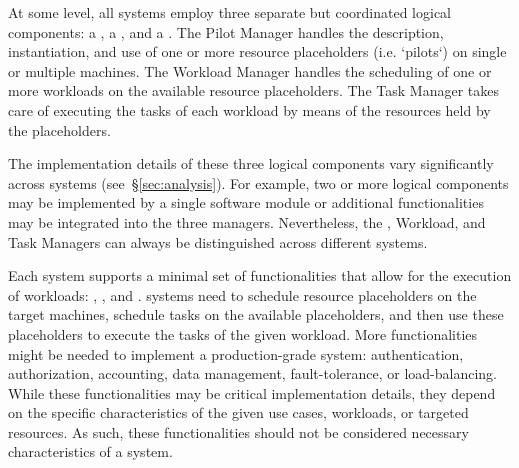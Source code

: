 \documentclass{sig-alternate}
\begin{document}
At some level, all \pilotjob systems employ three separate but coordinated
logical components: a , a , and a
. The Pilot Manager handles the description, instantiation,
and use of one or more resource placeholders (i.e. `pilots`) on single or
multiple machines. The Workload Manager handles the scheduling of one or more
workloads on the available resource placeholders. The Task Manager takes care of
executing the tasks of each workload by means of the resources held by the
placeholders.

The implementation details of these three logical components vary significantly
across \pilotjob systems (see~\S\ref{sec:analysis}).
For example, two or more logical components may be implemented by a single
software module or additional functionalities may be integrated into the three
managers. Nevertheless, the \pilot, Workload, and Task Managers can always be
distinguished across different \pilotjob systems.


Each \pilotjob system supports a minimal set of functionalities that allow for
the execution of workloads: , , and . \pilotjob systems need to schedule
resource placeholders on the target machines, schedule tasks on the available
placeholders, and then use these placeholders to execute the tasks of the given
workload. More functionalities might be needed to implement a production-grade
\pilotjob system: authentication, authorization, accounting, data management,
fault-tolerance, or load-balancing. While these functionalities may be critical
implementation details, they depend on the specific characteristics of the given
use cases, workloads, or targeted resources. As such, these functionalities
should not be considered necessary characteristics of a \pilotjob system.
\end{document}

